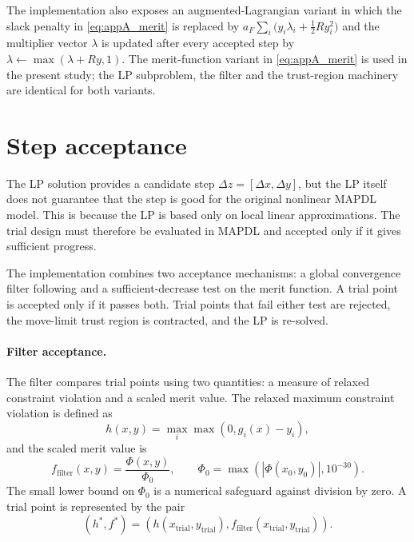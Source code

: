 The implementation also exposes an augmented-Lagrangian variant in
which the slack penalty in \autoref{eq:appA_merit} is replaced by
$a_F\sum_i\bigl(y_i\lambda_i+\tfrac{1}{2}Ry_i^2\bigr)$ and the
multiplier vector $\lambda$ is updated after every accepted step by
$\lambda \leftarrow \max(\lambda + Ry, 1)$. The merit-function
variant in \autoref{eq:appA_merit} is used in the present study; the
LP subproblem, the filter and the trust-region machinery are
identical for both variants.

\section{Step acceptance}
\label{sec:slpA:accept}

The LP solution provides a candidate step
$\Delta z=[\Delta x,\Delta y]$, but the LP itself does not guarantee
that the step is good for the original nonlinear MAPDL model. This is
because the LP is based only on local linear approximations. The
trial design must therefore be evaluated in MAPDL and accepted only
if it gives sufficient progress.

The implementation combines two acceptance mechanisms: a global
convergence filter following \cite{sorensen2015thicknessfilters} and a
sufficient-decrease test on the merit function. A trial point is
accepted only if it passes both. Trial points that fail either test
are rejected, the move-limit trust region is contracted, and the LP
is re-solved.

\paragraph{Filter acceptance.}

The filter compares trial points using two quantities: a measure of
relaxed constraint violation and a scaled merit value. The relaxed
maximum constraint violation is defined as
\begin{equation}
\label{eq:appA_filter_h}
    h(x,y)
    =
    \max_i
    \max\left(0, g_i(x)-y_i\right),
\end{equation}
and the scaled merit value is
\begin{equation}
\label{eq:appA_filter_f}
    f_{\mathrm{filter}}(x,y)
    =
    \frac{\Phi(x,y)}{\Phi_0},
    \qquad
    \Phi_0=\max\!\left(|\Phi(x_0,y_0)|,10^{-30}\right) .
\end{equation}
The small lower bound on $\Phi_0$ is a numerical safeguard against
division by zero. A trial point is represented by the pair
\begin{equation}
\label{eq:appA_filter_pair}
    \left(h^*, f^*\right)
    =
    \left(
        h(x_{\mathrm{trial}},y_{\mathrm{trial}}),
        f_{\mathrm{filter}}(x_{\mathrm{trial}},y_{\mathrm{trial}})
    \right).
\end{equation}

